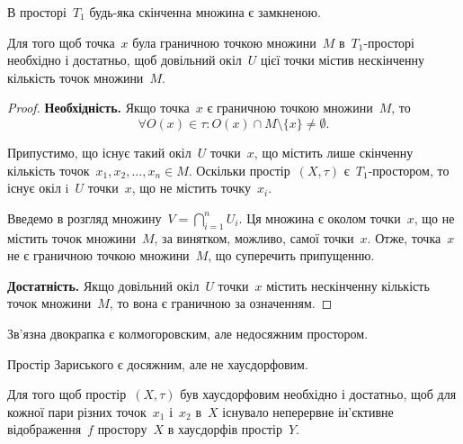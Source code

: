 \begin{corollary}
    В просторі~$T_1$ будь-яка скінченна множина є замкненою.
\end{corollary}

\begin{theorem}
    Для того щоб точка~$x$ була граничною точкою множини~$M$ в~$T_1$-просторі необхідно і достатньо, щоб довільний окіл~$U$ цієї точки містив нескінченну кількість точок множини~$M$.
\end{theorem}

\begin{proof}
    \textbf{Необхідність.} Якщо точка~$x$ є граничною точкою множини~$M$, то \[ \forall O(x) \in \tau: O(x) \cap M \setminus \{x\} \ne \emptyset. \]

    Припустимо, що існує такий окіл~$U$ точки~$x$, що містить лише скінченну кількість точок~$x_1, x_2, \ldots, x_n \in M$. Оскільки простір~$(X, \tau)$ є~$T_1$-простором, то існує окіл i~$U$ точки~$x$, що не містить точку~$x_i$.

    Введемо в розгляд множину~$V = \bigcap_{i = 1}^n U_i$. Ця множина є околом точки~$x$, що не містить точок множини~$M$, за винятком, можливо, самої точки~$x$. Отже, точка~$x$ не є граничною точкою множини~$M$, що суперечить припущенню.

    \textbf{Достатність.} Якщо довільний окіл~$U$ точки~$x$ містить нескінченну кількість точок множини~$M$, то вона є граничною за означенням.
\end{proof}

\begin{example}
    Зв'язна двокрапка є колмогоровским, але недосяжним простором.
\end{example}

\begin{example}
    Простір Зариського є досяжним, але не хаусдорфовим.
\end{example}

\begin{theorem}
    Для того щоб простір~$(X, \tau)$ був хаусдорфовим необхідно і достатньо, щоб для кожної пари різних точок~$x_1$ і~$x_2$ в~$X$ існувало неперервне ін'єктивне відображення~$f$ простору~$X$ в хаусдорфів простір~$Y$.
\end{theorem}

